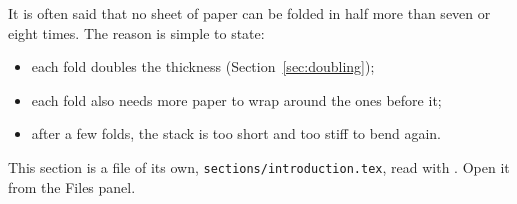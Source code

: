 It is often said that no sheet of paper can be folded in half more than seven or eight
times. The reason is simple to state:
\begin{itemize}
  \item each fold doubles the thickness (Section~\ref{sec:doubling});
  \item each fold also needs more paper to wrap around the ones before it;
  \item after a few folds, the stack is too short and too stiff to bend again.
\end{itemize}
This section is a file of its own, \texttt{sections/introduction.tex}, read with
\verb||. Open it from the Files panel.
